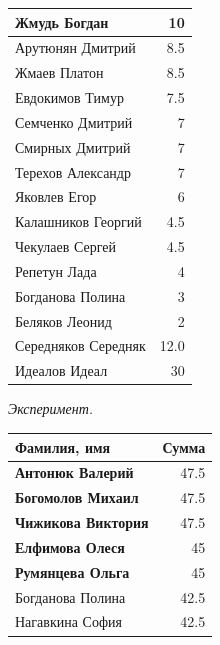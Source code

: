 \documentclass[12pt]{article}
\newlength{\h}
\newlength{\x}
\begin{document}
\begin{table}[ht]
\begin{minipage}[t]{0.48\linewidth}
\begin{tabular}{|l|r|}
      Жмудь Богдан           &     10  \\
      \hline
      Арутюнян Дмитрий       &    8.5  \\
      \hline
      Жмаев Платон           &    8.5  \\
      \hline
      Евдокимов Тимур        &    7.5  \\
      \hline
      Семченко Дмитрий       &      7  \\
      \hline
      Смирных Дмитрий        &     7  \\
      \hline
      Терехов Александр      &     7  \\
      \hline
      Яковлев Егор           &      6  \\
      \hline
      Калашников Георгий     &    4.5  \\
      \hline
      Чекулаев Сергей        &    4.5  \\
      \hline
      Репетун Лада           &      4  \\
      \hline
      Богданова Полина       &      3  \\
      \hline
      Беляков Леонид         &      2  \\
      \hline
      Середняков Середняк    &   12.0  \\
      Идеалов Идеал          &     30  \\
      \hline
    \end{tabular}
  \end{minipage}
  \hfill
  \begin{minipage}[t]{0.48\linewidth}\centering
    \begin{center}
      \textit{Эксперимент.}
    \end{center}
    \begin{tabular}{|l|r|}
      \hline
      Фамилия, имя           &  Сумма  \\
      \hline
      \textbf{Антонюк Валерий}        &   47.5  \\
      \hline
      \textbf{Богомолов Михаил}       &   47.5  \\
      \hline
      \textbf{Чижикова Виктория}      &   47.5  \\
      \hline
      \textbf{Елфимова Олеся}         &    45  \\
      \hline
      \textbf{Румянцева Ольга}        &    45  \\
      \hline
      Богданова Полина       &   42.5  \\
      \hline
      Нагавкина София        &   42.5  \\

\end{tabular}
\end{minipage}
\end{table}
\end{document}

